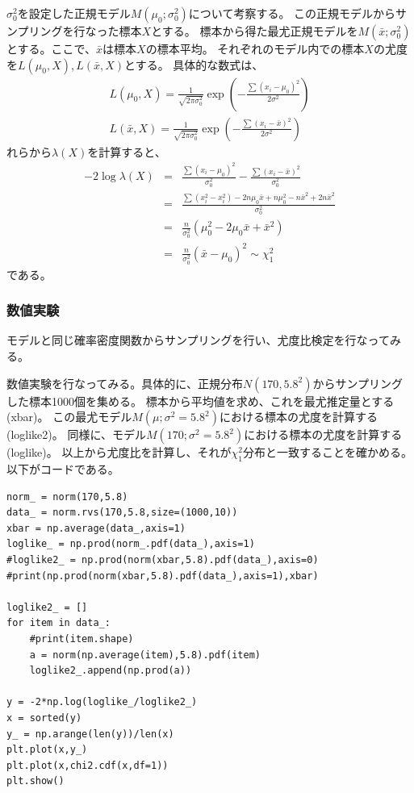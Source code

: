 $\sigma^2_0$を設定した正規モデル$M(\mu_0;\sigma^2_0)$について考察する。
この正規モデルからサンプリングを行なった標本$X$とする。
標本から得た最尤正規モデルを$M(\bar{x};\sigma^2_0)$とする。ここで、$\bar{x}$は標本$X$の標本平均。
それぞれのモデル内での標本$X$の尤度を$L(\mu_0,X),L(\bar{x},X)$とする。
具体的な数式は、
\begin{eqnarray*}
    L(\mu_0,X)=\frac{1}{\sqrt{2\pi\sigma_0^2}}\exp(-\frac{\sum(x_i-\mu_0)^2}{2\sigma^2})\\
    L(\bar{x},X)=\frac{1}{\sqrt{2\pi\sigma_0^2}}\exp(-\frac{\sum(x_i-\bar{x})^2}{2\sigma^2})
\end{eqnarray*}
れらから$\lambda(X)$を計算すると、
\begin{eqnarray*}
 -2\log\lambda(X) &=& \frac{ \sum (x_i-\mu_0)^2}{\sigma^2_0}-\frac{\sum (x_i-\bar{x})^2}{\sigma_0^2} \\
 &=& \frac{ \sum(x_i^2-x_i^2) -2n\mu_0\bar{x} +n\mu_0^2-n\bar{x}^2 +2n\bar{x}^2} {\sigma_0^2}\\
&=& \frac{n}{\sigma_0^2}(\mu_0^2 -2\mu_0\bar{x} +\bar{x}^2)  \\
 &=& \frac{n}{\sigma^2_0}(\bar{x}-\mu_0)^2 \sim \chi^2_1
\end{eqnarray*}
である。

\subsubsection{数値実験}
モデルと同じ確率密度関数からサンプリングを行い、尤度比検定を行なってみる。

数値実験を行なってみる。具体的に、正規分布$N(170,5.8^2)$からサンプリングした標本1000個を集める。
標本から平均値を求め、これを最尤推定量とする(xbar)。
この最尤モデル$M(\mu;\sigma^2=5.8^2) $における標本の尤度を計算する(loglike2)。
同様に、モデル$M(170;\sigma^2=5.8^2)$における標本の尤度を計算する(loglike)。
以上から尤度比を計算し、それが$\chi^2_1$分布と一致することを確かめる。
以下がコードである。

\begin{lstlisting}
norm_ = norm(170,5.8)
data_ = norm.rvs(170,5.8,size=(1000,10))
xbar = np.average(data_,axis=1)
loglike_ = np.prod(norm_.pdf(data_),axis=1)
#loglike2_ = np.prod(norm(xbar,5.8).pdf(data_),axis=0)
#print(np.prod(norm(xbar,5.8).pdf(data_),axis=1),xbar)

loglike2_ = []
for item in data_:
    #print(item.shape)
    a = norm(np.average(item),5.8).pdf(item)
    loglike2_.append(np.prod(a))

y = -2*np.log(loglike_/loglike2_)
x = sorted(y)
y_ = np.arange(len(y))/len(x)
plt.plot(x,y_)
plt.plot(x,chi2.cdf(x,df=1))
plt.show()

\end{lstlisting}

